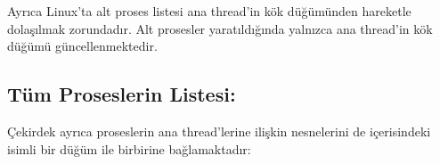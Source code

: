 \documentclass[a4paper,10pt,turkish]{sphinxmanual}
\begin{document}
\sphinxAtStartPar
Ayrıca Linux’ta alt proses listesi ana thread’in  kök düğümünden hareketle dolaşılmak
zorundadır. Alt prosesler yaratıldığında yalnızca ana thread’in  kök düğümü güncellenmektedir.


\subsection{Tüm Proseslerin Listesi: }
\label{\detokenize{processcontrolblock:tum-proseslerin-listesi-tasks}}
\sphinxAtStartPar
Çekirdek ayrıca proseslerin ana thread’lerine ilişkin  nesnelerini de 
içerisindeki  isimli bir düğüm ile birbirine bağlamaktadır:

\begin{sphinxVerbatim}[commandchars=\\\{\}]


\end{sphinxVerbatim}
\end{document}
